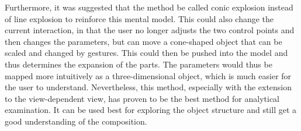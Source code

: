 Furthermore, it was suggested that the method be called conic explosion instead of line explosion to reinforce this mental model. This could also change the current interaction, in that the user no longer adjusts the two control points and then changes the parameters, but can move a cone-shaped object that can be scaled and changed by gestures. This could then be pushed into the model and thus determines the expansion of the parts. The parameters would thus be mapped more intuitively as a three-dimensional object, which is much easier for the user to understand. Nevertheless, this method, especially with the extension to the view-dependent view, has proven to be the best method for analytical examination. It can be used best for exploring the object structure and still get a good understanding of the composition.

